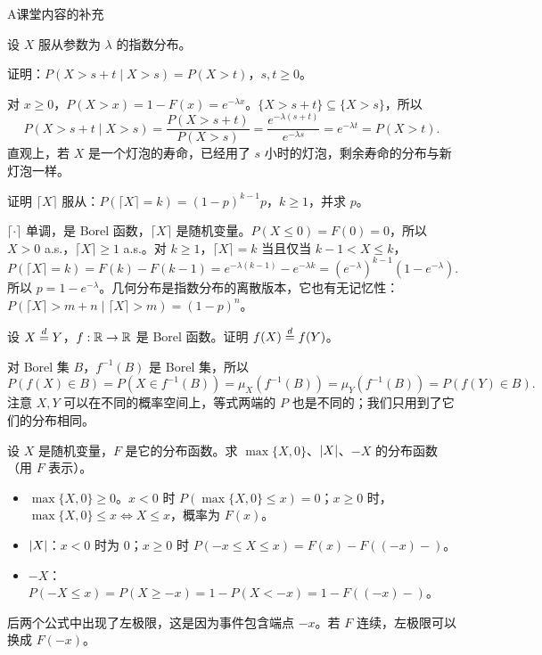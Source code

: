 \begin{exercises}{A}{课堂内容的补充}
\item\label{ex:distributions:A6} 设 $X$ 服从参数为 $\lambda$ 的指数分布。
\begin{questions}
\item 证明：$P(X>s+t\mid X>s)=P(X>t)$，$s,t\geqslant0$。
\begin{solution}
对 $x\geqslant0$，$P(X>x)=1-F(x)=e^{-\lambda x}$。$\{X>s+t\}\subseteq\{X>s\}$，所以
\[
P(X>s+t\mid X>s)=\frac{P(X>s+t)}{P(X>s)}=\frac{e^{-\lambda(s+t)}}{e^{-\lambda s}}=e^{-\lambda t}=P(X>t).
\]
直观上，若 $X$ 是一个灯泡的寿命，已经用了 $s$ 小时的灯泡，剩余寿命的分布与新灯泡一样。
\end{solution}
\item 证明 $\lceil X\rceil$ 服从：$P(\lceil X\rceil=k)=(1-p)^{k-1}p$，$k\geqslant1$，并求 $p$。
\begin{solution}
$\lceil\cdot\rceil$ 单调，是 Borel 函数，$\lceil X\rceil$ 是随机变量。$P(X\leqslant0)=F(0)=0$，所以 $X>0$ a.s.，$\lceil X\rceil\geqslant1$ a.s.。对 $k\geqslant1$，$\lceil X\rceil=k$ 当且仅当 $k-1<X\leqslant k$，
\[
P(\lceil X\rceil=k)=F(k)-F(k-1)=e^{-\lambda(k-1)}-e^{-\lambda k}=(e^{-\lambda})^{k-1}(1-e^{-\lambda}).
\]
所以 $p=1-e^{-\lambda}$。几何分布是指数分布的离散版本，它也有无记忆性：$P(\lceil X\rceil>m+n\mid\lceil X\rceil>m)=(1-p)^n$。
\end{solution}
\end{questions}

\item\label{ex:distributions:A7} 设 $X\stackrel{d}{=} Y$，$f:\mathbb{R}\to\mathbb{R}$ 是 Borel 函数。证明 $f(X)\stackrel{d}{=} f(Y)$。
\begin{solution}
对 Borel 集 $B$，$f^{-1}(B)$ 是 Borel 集，所以
\[
P(f(X)\in B)=P(X\in f^{-1}(B))=\mu_X(f^{-1}(B))=\mu_Y(f^{-1}(B))=P(f(Y)\in B).
\]
注意 $X,Y$ 可以在不同的概率空间上，等式两端的 $P$ 也是不同的；我们只用到了它们的分布相同。
\end{solution}

\item\label{ex:distributions:A8} 设 $X$ 是随机变量，$F$ 是它的分布函数。求 $\max\{X,0\}$、$\lvert X\rvert$、$-X$ 的分布函数（用 $F$ 表示）。
\begin{solution}
\begin{itemize}
\item $\max\{X,0\}\geqslant0$。$x<0$ 时 $P(\max\{X,0\}\leqslant x)=0$；$x\geqslant0$ 时，$\max\{X,0\}\leqslant x\iff X\leqslant x$，概率为 $F(x)$。
\item $\lvert X\rvert$：$x<0$ 时为 $0$；$x\geqslant0$ 时 $P(-x\leqslant X\leqslant x)=F(x)-F((-x)-)$。
\item $-X$：$P(-X\leqslant x)=P(X\geqslant-x)=1-P(X<-x)=1-F((-x)-)$。
\end{itemize}
后两个公式中出现了左极限，这是因为事件包含端点 $-x$。若 $F$ 连续，左极限可以换成 $F(-x)$。
\end{solution}


\end{exercises}
